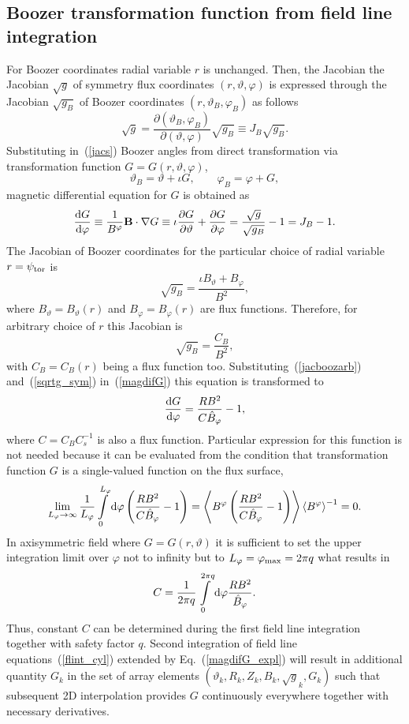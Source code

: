 \documentclass[12pt]{article}
\newcommand{\be}[1]{\begin{equation} \label{#1}}
\newcommand{\ee}{\end{equation}}
\newcommand{\eq}[1]{(\ref{#1})}
\newcommand{\difp}[2]{\frac{\partial #1}{\partial #2}}
\newcommand{\bB}{{\bf B}}
\newcommand{\rd}{{\rm d}}
\begin{document}
\subsection{Boozer transformation function from field line integration}
\label{ssec:boozerdata}

For Boozer coordinates radial variable $r$ is unchanged.
Then, the Jacobian the Jacobian $\sqrt{g}$ of symmetry flux coordinates $(r,\vartheta,\varphi)$
is expressed through the Jacobian $\sqrt{g_B}$ of Boozer coordinates $(r,\vartheta_B,\varphi_B)$
as follows
\be{jacs}
\sqrt{g} = \difp{(\vartheta_B,\varphi_B)}{(\vartheta,\varphi)}\sqrt{g_B} \equiv J_B \sqrt{g_B}.
\ee
Substituting in~\eq{jacs} Boozer angles from direct transformation via transformation function $G=G(r,\vartheta,\varphi)$,
\be{invtrans}
\vartheta_B = \vartheta+\iota G,
\qquad
\varphi_B = \varphi+G,
\ee
magnetic differential equation for $G$ is obtained as
\be{magdifG}
\frac{\rd G}{\rd \varphi} \equiv \frac{1}{B^\varphi}\bB\cdot\nabla G \equiv \iota \difp{G}{\vartheta}+\difp{G}{\varphi}=\frac{\sqrt{g}}{\sqrt{g_B}}-1
=J_B-1.
\ee
The Jacobian of Boozer coordinates for the particular choice of radial variable $r=\psi_{\rm tor}$ is
\be{jacbooz}
\sqrt{g_B}=\frac{\iota B_\vartheta + B_\varphi}{B^2},
\ee
where $B_\vartheta=B_\vartheta(r)$ and $B_\varphi=B_\varphi(r)$ are flux functions. Therefore, for arbitrary choice of $r$ this Jacobian is
\be{jacboozarb}
\sqrt{g_B}=\frac{C_B}{B^2},
\ee
with $C_B=C_B(r)$ being a flux function too. Substituting~\eq{jacboozarb} and~\eq{sqrtg_sym} in~\eq{magdifG} this equation is transformed to
\be{magdifG_expl}
\frac{\rd G}{\rd \varphi} =\frac{R B^2}{C \hat B_\varphi}-1,
\ee
where $C=C_B C_s^{-1}$ is also a flux function. Particular expression for this function is not needed because it can be evaluated from the condition
that transformation function $G$ is a single-valued function on the flux surface,
\be{singval}
\lim_{L_\varphi \rightarrow \infty}\frac{1}{L_\varphi}\int\limits_0^{L_\varphi} \rd\varphi\left(\frac{R B^2}{C \hat B_\varphi}-1\right)
= \left\langle B^\varphi\left(\frac{R B^2}{C\hat B_\varphi}-1\right)\right\rangle \left\langle B^\varphi \right\rangle^{-1} = 0.
\ee
In axisymmetric field where $G=G(r,\vartheta)$ it is sufficient to set the upper integration limit over $\varphi$ not to infinity
but to $L_\varphi=\varphi_{\rm max}=2\pi q$ what results in
\be{Cdef}
C = \frac{1}{2\pi q} \int\limits_0^{2\pi q} \rd\varphi \frac{R B^2}{\hat B_\varphi}.
\ee
Thus, constant $C$ can be determined during the first field line integration together with safety factor $q$.
Second integration of field line equations~\eq{flint_cyl} extended by Eq.~\eq{magdifG_expl} will result in additional quantity $G_k$ 
in the set of array elements $(\vartheta_k, R_k, Z_k, B_k, \sqrt{g}_k, G_k)$ such that subsequent 2D interpolation provides $G$ continuously 
everywhere together with necessary derivatives.
\end{document}
